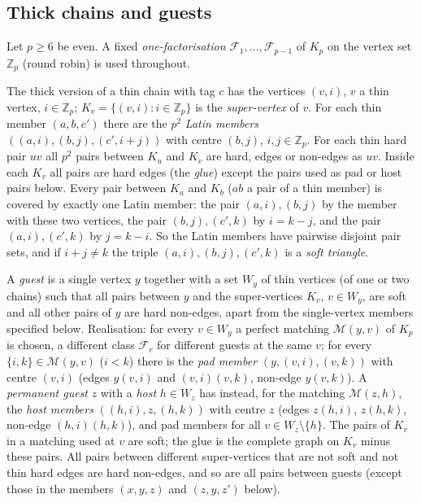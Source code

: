 \subsection{Thick chains and guests}\label{sec:hthick}
Let $p\ge6$ be even. A fixed \emph{one-factorisation} $\mathcal F_1,\dots,\mathcal F_{p-1}$ of $K_p$ on the vertex set $\mathbb Z_p$ (round robin) is used throughout.

 The thick version of a thin chain with tag $c$ has the vertices $(v,i)$, $v$ a thin vertex, $i\in\mathbb Z_p$; $K_v=\{(v,i):i\in\mathbb Z_p\}$ is the \emph{super-vertex} of $v$. For each thin member $(a,b,c')$ there are the $p^2$ \emph{Latin members} $((a,i),(b,j),(c',i+j))$ with centre $(b,j)$, $i,j\in\mathbb Z_p$. For each thin hard pair $uv$ all $p^2$ pairs between $K_u$ and $K_v$ are hard, edges or non-edges as $uv$. Inside each $K_v$ all pairs are hard edges (the \emph{glue}) except the pairs used as pad or host pairs below. Every pair between $K_a$ and $K_b$ ($ab$ a pair of a thin member) is covered by exactly one Latin member: the pair $(a,i),(b,j)$ by the member with these two vertices, the pair $(b,j),(c',k)$ by $i=k-j$, and the pair $(a,i),(c',k)$ by $j=k-i$. So the Latin members have pairwise disjoint pair sets, and if $i+j\ne k$ the triple $(a,i),(b,j),(c',k)$ is a \emph{soft triangle}.

 A \emph{guest} is a single vertex $y$ together with a set $W_y$ of thin vertices (of one or two chains) such that all pairs between $y$ and the super-vertices $K_v$, $v\in W_y$, are soft and all other pairs of $y$ are hard non-edges, apart from the single-vertex members specified below. Realisation: for every $v\in W_y$ a perfect matching $\mathcal M(y,v)$ of $K_p$ is chosen, a different class $\mathcal F_r$ for different guests at the same $v$; for every $\{i,k\}\in\mathcal M(y,v)$ ($i<k$) there is the \emph{pad member} $(y,(v,i),(v,k))$ with centre $(v,i)$ (edges $y(v,i)$ and $(v,i)(v,k)$, non-edge $y(v,k)$). A \emph{permanent guest} $z$ with a \emph{host} $h\in W_z$ has instead, for the matching $\mathcal M(z,h)$, the \emph{host members} $((h,i),z,(h,k))$ with centre $z$ (edges $z(h,i)$, $z(h,k)$, non-edge $(h,i)(h,k)$), and pad members for all $v\in W_z\setminus\{h\}$. The pairs of $K_v$ in a matching used at $v$ are soft; the glue is the complete graph on $K_v$ minus these pairs. All pairs between different super-vertices that are not soft and not thin hard edges are hard non-edges, and so are all pairs between guests (except those in the members $(x,y,z)$ and $(z,y,z')$ below).

